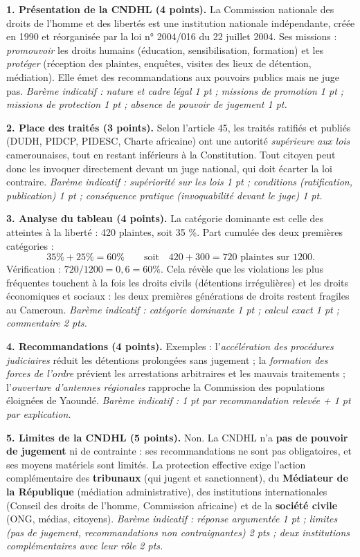 \documentclass[11pt]{article}
\begin{document}
\begin{corrige}
\textbf{1. Présentation de la CNDHL (4 points).} La Commission nationale des droits de l'homme et des libertés est une institution nationale indépendante, créée en 1990 et réorganisée par la loi n° 2004/016 du 22 juillet 2004. Ses missions : \emph{promouvoir} les droits humains (éducation, sensibilisation, formation) et les \emph{protéger} (réception des plaintes, enquêtes, visites des lieux de détention, médiation). Elle émet des recommandations aux pouvoirs publics mais ne juge pas. \emph{Barème indicatif : nature et cadre légal 1 pt ; missions de promotion 1 pt ; missions de protection 1 pt ; absence de pouvoir de jugement 1 pt.}

\textbf{2. Place des traités (3 points).} Selon l'article 45, les traités ratifiés et publiés (DUDH, PIDCP, PIDESC, Charte africaine) ont une autorité \emph{supérieure aux lois} camerounaises, tout en restant inférieurs à la Constitution. Tout citoyen peut donc les invoquer directement devant un juge national, qui doit écarter la loi contraire. \emph{Barème indicatif : supériorité sur les lois 1 pt ; conditions (ratification, publication) 1 pt ; conséquence pratique (invoquabilité devant le juge) 1 pt.}

\textbf{3. Analyse du tableau (4 points).} La catégorie dominante est celle des atteintes à la liberté : 420 plaintes, soit 35 \%. Part cumulée des deux premières catégories :
\[ 35\% + 25\% = 60\% \qquad \text{soit} \quad 420 + 300 = 720 \text{ plaintes sur } 1200. \]
Vérification : $720 / 1200 = 0{,}6 = 60\%$. Cela révèle que les violations les plus fréquentes touchent à la fois les droits civils (détentions irrégulières) et les droits économiques et sociaux : les deux premières générations de droits restent fragiles au Cameroun. \emph{Barème indicatif : catégorie dominante 1 pt ; calcul exact 1 pt ; commentaire 2 pts.}

\textbf{4. Recommandations (4 points).} Exemples : l'\emph{accélération des procédures judiciaires} réduit les détentions prolongées sans jugement ; la \emph{formation des forces de l'ordre} prévient les arrestations arbitraires et les mauvais traitements ; l'\emph{ouverture d'antennes régionales} rapproche la Commission des populations éloignées de Yaoundé. \emph{Barème indicatif : 1 pt par recommandation relevée + 1 pt par explication.}

\textbf{5. Limites de la CNDHL (5 points).} Non. La CNDHL n'a \textbf{pas de pouvoir de jugement} ni de contrainte : ses recommandations ne sont pas obligatoires, et ses moyens matériels sont limités. La protection effective exige l'action complémentaire des \textbf{tribunaux} (qui jugent et sanctionnent), du \textbf{Médiateur de la République} (médiation administrative), des institutions internationales (Conseil des droits de l'homme, Commission africaine) et de la \textbf{société civile} (ONG, médias, citoyens). \emph{Barème indicatif : réponse argumentée 1 pt ; limites (pas de jugement, recommandations non contraignantes) 2 pts ; deux institutions complémentaires avec leur rôle 2 pts.}


\end{corrige}
\end{document}
